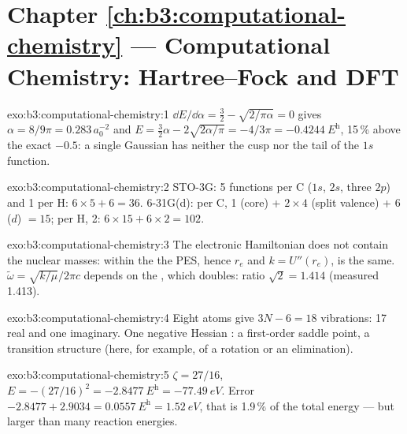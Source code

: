 \section*{Chapter \ref{ch:b3:computational-chemistry} --- Computational Chemistry: Hartree--Fock and DFT}

\begin{solution}{exo:b3:computational-chemistry:1}
$\dd E/\dd\alpha = \frac32 - \sqrt{2/\pi\alpha} = 0$ gives $\alpha = 8/9\pi = 0.283\,
a_0^{-2}$ and $E = \frac32\alpha - 2\sqrt{2\alpha/\pi} = -4/3\pi = \qty{-0.4244}{\hartree}$,
15\,\% above the exact $-0.5$: a single Gaussian has neither the cusp nor the
tail of the $1s$ function.
\end{solution}

\begin{solution}{exo:b3:computational-chemistry:2}
STO-3G: 5 functions per C ($1s$, $2s$, three $2p$) and 1 per H: $6 \times 5 + 6 =
36$. 6-31G(d): per C, 1 (core) + $2 \times 4$ (split valence) + 6 ($d$) $= 15$;
per H, 2: $6 \times 15 + 6 \times 2 = 102$.
\end{solution}

\begin{solution}{exo:b3:computational-chemistry:3}
The electronic Hamiltonian does not contain the nuclear masses: within the
 the PES, hence $r_e$ and $k = U''(r_e)$, is the
same. $\tilde\omega = \sqrt{k/\mu}/2\pi c$ depends on the , which
doubles: ratio $\sqrt2 = 1.414$ (measured 1.413).
\end{solution}

\begin{solution}{exo:b3:computational-chemistry:4}
Eight atoms give $3N - 6 = 18$ vibrations: 17 real and one imaginary. One
negative Hessian : a first-order saddle point, a transition
structure (here, for example, of a rotation or an elimination).
\end{solution}

\begin{solution}{exo:b3:computational-chemistry:5}
$\zeta = 27/16$, $E = -(27/16)^2 = \qty{-2.8477}{\hartree} = \qty{-77.49}{eV}$.
Error $-2.8477 + 2.9034 = \qty{0.0557}{\hartree} = \qty{1.52}{eV}$, that is
1.9\,\% of the total energy --- but larger than many reaction energies.
\end{solution}

